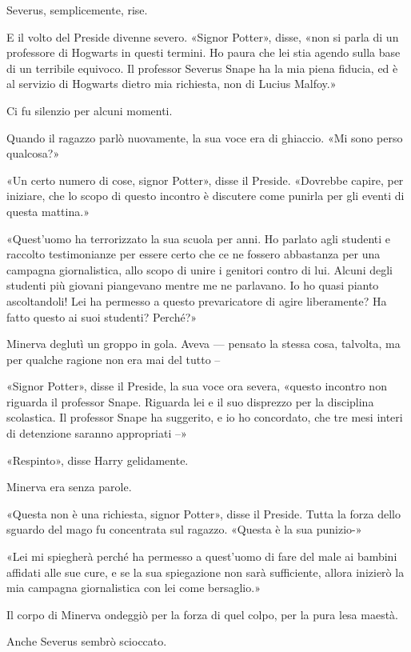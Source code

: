 Severus, semplicemente, rise.

E il volto del Preside divenne severo. «Signor Potter», disse, «non si parla di un professore di Hogwarts in questi termini. Ho paura che lei stia agendo sulla base di un terribile equivoco. Il professor Severus Snape ha la mia piena fiducia, ed è al servizio di Hogwarts dietro mia richiesta, non di Lucius Malfoy.»

Ci fu silenzio per alcuni momenti.

Quando il ragazzo parlò nuovamente, la sua voce era di ghiaccio. «Mi sono perso qualcosa?»

«Un certo numero di cose, signor Potter», disse il Preside. «Dovrebbe capire, per iniziare, che lo scopo di questo incontro è discutere come punirla per gli eventi di questa mattina.»

«Quest’uomo ha terrorizzato la sua scuola per anni. Ho parlato agli studenti e raccolto testimonianze per essere certo che ce ne fossero abbastanza per una campagna giornalistica, allo scopo di unire i genitori contro di lui. Alcuni degli studenti più giovani piangevano mentre me ne parlavano. Io ho quasi pianto ascoltandoli! Lei ha permesso a questo prevaricatore di agire liberamente? Ha fatto questo ai suoi studenti? Perché?»

Minerva deglutì un groppo in gola. Aveva — pensato la stessa cosa, talvolta, ma per qualche ragione non era mai del tutto –

«Signor Potter», disse il Preside, la sua voce ora severa, «questo incontro non riguarda il professor Snape. Riguarda lei e il suo disprezzo per la disciplina scolastica. Il professor Snape ha suggerito, e io ho concordato, che tre mesi interi di detenzione saranno appropriati –»

«Respinto», disse Harry gelidamente.

Minerva era senza parole.

«Questa non è una richiesta, signor Potter», disse il Preside. Tutta la forza dello sguardo del mago fu concentrata sul ragazzo. «Questa è la sua punizio-»

«Lei mi spiegherà perché ha permesso a quest’uomo di fare del male ai bambini affidati alle sue cure, e se la sua spiegazione non sarà sufficiente, allora inizierò la mia campagna giornalistica con lei come bersaglio.»

Il corpo di Minerva ondeggiò per la forza di quel colpo, per la pura lesa maestà.

Anche Severus sembrò scioccato.

